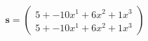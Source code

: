 \documentclass[preview]{standalone}
\begin{document}
\begin{align*}
\mathbf{s} = \begin{pmatrix}5 + -10x^{1} + 6x^{2} + 1x^{3} \\ 5 + -10x^{1} + 6x^{2} + 1x^{3}\end{pmatrix}
\end{align*}
\end{document}
